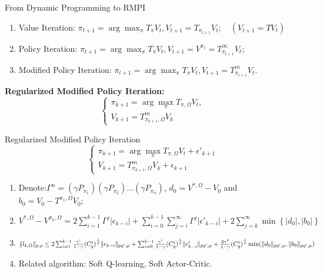 \documentclass{beamer}
\begin{document}
\begin{frame}[t]{From Dynamic Programming to RMPI}
    \begin{enumerate}
        \item Value Iteration: $ \pi_{t+1} = \arg\max_{\pi} T_{\pi} V_{t}, V_{t+1} = T_{\pi_{t+1}} V_t; \quad (V_{t+1} = T V_t) $
        \item Policy Iteration: $  \pi_{t+1} = \arg\max_{\pi} T_{\pi} V_{t}, V_{t+1} = V^{\pi_{t}} = T^{\infty}_{\pi_{t+1}} V_{t}$;
        \item Modified Policy Iteration: $ \pi_{t+1} = \arg\max_{\pi} T_{\pi} V_t, V_{t+1} = T^{m}_{\pi_{t+1}} V_t $.
    \end{enumerate}
    \textbf{Regularized Modified Policy Iteration:}
    \[
        \begin{cases}
            \pi_{k+1} = \arg\max_{\pi} T_{\pi, \Omega} V_t,\\
            V_{k+1} = T^{m}_{\pi_{k+1}, \Omega} V_k
        \end{cases}
    \]
\end{frame}

\begin{frame}[t]{Regularized Modified Policy Iteration}
    \[
        \begin{cases}
            \pi_{k+1} = \arg\max_{\pi} T_{\pi, \Omega} V_t + \epsilon'_{k+1}\\
            V_{k+1} = T^{m}_{\pi_{k+1}, \Omega} V_k + \epsilon_{k+1}
        \end{cases}
    \]
    \begin{enumerate}
        \item Denote:$ \Gamma^n = (\gamma P_{\pi_1})(\gamma P_{\pi_2})\ldots(\gamma P_{\pi_n}) $, $ d_0 = V^{*,\Omega} - V_0 $ and $ b_0 = V_0 - T^{\pi_1,\Omega} V_0 $;
        \item $ V^{*,\Omega} - V^{\pi_k,\Omega} = 2 \sum^{k-1}_{i=1} \Gamma^{j} \left| \epsilon_{k-i} \right| + \sum^{k-1}_{i=0} \sum^{\infty}_{j=i} \Gamma^{j} \left| \epsilon'_{k-i} \right| + 2\sum^{\infty}_{j=k} \min \left\{ \left| d_0 \right|, \left| b_0 \right| \right\} $
        \item
            $  \Arrowvert l_{k,\Omega} \Arrowvert_{p,\rho} \le 2 \sum^{k-1}_{i=1} \frac{\gamma^i}{1 - \gamma} {(C^{i}_q)}^{\frac{1}{p} } \Arrowvert \epsilon_{k-i} \Arrowvert_{pq', \mu} + \sum^{k-1}_{i=0} \frac{\gamma^i}{1 - \gamma} {(C^{i}_{q})}^{    \frac{1}{p} } \Arrowvert \epsilon'_{k-i} \Arrowvert_{pq', \mu} + \frac{2\gamma^{k}}{1 - \gamma} {(C^{i}_{q})}^{\frac{1}{p}     } \min ( \Arrowvert d_0 \Arrowvert_{pq',\mu}, \Arrowvert b_0 \Arrowvert_{pq',\mu})$
        \item Related algorithm: Soft Q-learning, Soft Actor-Critic.
    \end{enumerate}
\end{frame}
\end{document}
